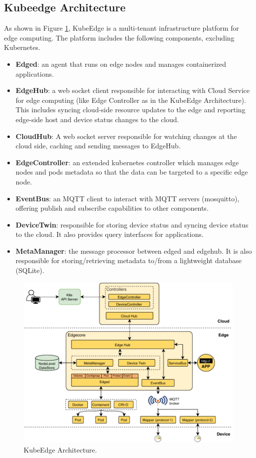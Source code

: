\subsection{Kubeedge Architecture}
As shown in Figure \ref{fig:kubeedge-arch}, KubeEdge is a multi-tenant infrastructure platform for edge computing.
The platform includes the following components, excluding Kubernetes.
\begin{itemize}
	\item \textbf{Edged}: an agent that runs on edge nodes and manages containerized applications.
	\item \textbf{EdgeHub}: a web socket client responsible for interacting with Cloud Service for edge computing (like Edge
	Controller as in the KubeEdge Architecture). This includes syncing cloud-side resource updates to the edge and
	reporting edge-side host and device status changes to the cloud.
	\item \textbf{CloudHub}: A web socket server responsible for watching changes at the cloud side, caching and sending
	messages to EdgeHub.
	\item \textbf{EdgeController}: an extended kubernetes controller which manages edge nodes and pods metadata so that the
	data can be targeted to a specific edge node.
	\item \textbf{EventBus}: an MQTT client to interact with MQTT servers (mosquitto), offering publish and subscribe capabilities to other components.
	\item \textbf{DeviceTwin}: responsible for storing device status and syncing device status to the cloud. It also provides query
	interfaces for applications.
	\item \textbf{MetaManager}: the message processor between edged and edgehub. It is also responsible for storing/retrieving
	metadata to/from a lightweight database (SQLite).
\end{itemize}

\begin{figure}[tbp]
	\centering
	\includegraphics[width=\textwidth]{images/kubeedge-arch}
	\caption{KubeEdge Architecture.}
	\label{fig:kubeedge-arch}
\end{figure}




\clearpage
\thispagestyle{empty}